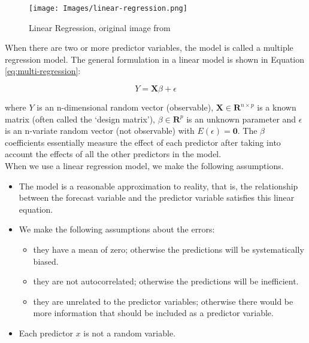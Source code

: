 \documentclass[12pt, a4paper]{article}
\begin{document}
\begin{figure}[H]
\begin{center}
    \texttt{[image: Images/linear-regression.png]}
    \caption{Linear Regression, original image from \cite{forecasting-book}}
    \label{fig:lin-reg}
\end{center}
\end{figure}

When there are two or more predictor variables, the model is called a multiple regression model. The general formulation in a linear model is shown in Equation \ref{eq:multi-regression}:

\begin{equation}
    Y = \mathbf{X}\beta + \epsilon
    \label{eq:multi-regression}
\end{equation}

where $Y$ is an n-dimensional random vector (observable), $\mathbf{X} \in \mathbf{R} ^{n \times p}$ is a known matrix (often called the `design matrix'), $\beta \in \mathbf{R}^p$ is an unknown parameter and $\epsilon$ is an n-variate random vector (not observable) with $E(\epsilon) = \mathbf{0}$. The $\beta$ coefficients essentially measure the effect of each predictor after taking into account the effects of all the other predictors in the model. \\

When we use a linear regression model, we make the following assumptions.

\begin{itemize}
    \item The model is a reasonable approximation to reality, that is, the relationship between the forecast variable and the predictor variable satisfies this linear equation.
    \item We make the following assumptions about the errors:
    \begin{itemize}
        \item they have a mean of zero; otherwise the predictions will be systematically biased.
        \item they are not autocorrelated; otherwise the predictions will be inefficient.
        \item they are unrelated to the predictor variables; otherwise there would be more information that should be included as a predictor variable.
    \end{itemize}
    \item Each predictor $x$ is not a random variable.
\end{itemize}
\end{document}
